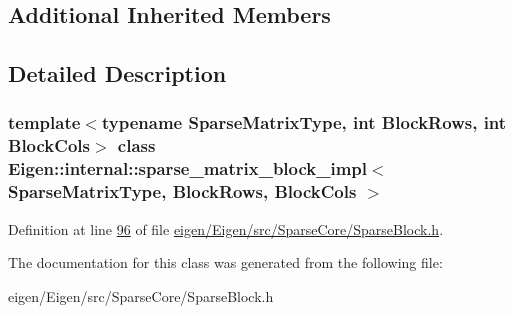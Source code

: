 \subsection*{Additional Inherited Members}


\subsection{Detailed Description}
\subsubsection*{template$<$typename Sparse\+Matrix\+Type, int Block\+Rows, int Block\+Cols$>$\newline
class Eigen\+::internal\+::sparse\+\_\+matrix\+\_\+block\+\_\+impl$<$ Sparse\+Matrix\+Type, Block\+Rows, Block\+Cols $>$}



Definition at line \hyperlink{eigen_2_eigen_2src_2_sparse_core_2_sparse_block_8h_source_l00096}{96} of file \hyperlink{eigen_2_eigen_2src_2_sparse_core_2_sparse_block_8h_source}{eigen/\+Eigen/src/\+Sparse\+Core/\+Sparse\+Block.\+h}.



The documentation for this class was generated from the following file\+:\begin{DoxyCompactItemize}
\item 
eigen/\+Eigen/src/\+Sparse\+Core/\+Sparse\+Block.\+h\end{DoxyCompactItemize}
